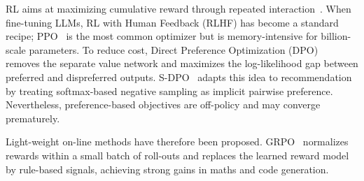 RL aims at maximizing cumulative reward through repeated interaction~\citep{RLsurvey}.  
When fine-tuning LLMs, RL with Human Feedback (RLHF) has become a standard recipe; PPO~\citep{PPO} is the most common optimizer but is memory-intensive for billion-scale parameters.  
To reduce cost, Direct Preference Optimization (DPO)~\citep{DPO} removes the separate value network and maximizes the log-likelihood gap between preferred and dispreferred outputs.  
S-DPO~\citep{sdpo} adapts this idea to recommendation by treating softmax-based negative sampling as implicit pairwise preference.  
Nevertheless, preference-based objectives are off-policy and may converge prematurely.

Light-weight on-line methods have therefore been proposed.  
GRPO~\citep{deepseekmath} normalizes rewards within a small batch of roll-outs and replaces the learned reward model by rule-based signals, achieving strong gains in maths and code generation.  
